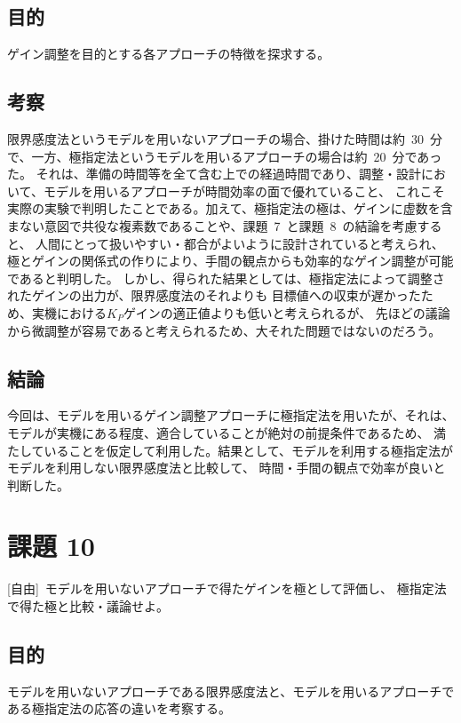\documentclass[10pt]{jarticle}
\begin{document}
\subsection{目的}
%
ゲイン調整を目的とする各アプローチの特徴を探求する。
%

\subsection{考察}
%
限界感度法というモデルを用いないアプローチの場合、掛けた時間は約\ 30\ 分で、一方、極指定法というモデルを用いるアプローチの場合は約\ 20\ 分であった。
それは、準備の時間等を全て含む上での経過時間であり、調整・設計において、モデルを用いるアプローチが時間効率の面で優れていること、
これこそ実際の実験で判明したことである。加えて、極指定法の極は、ゲインに虚数を含まない意図で共役な複素数であることや、課題\ 7\ と課題\ 8\ の結論を考慮すると、
人間にとって扱いやすい・都合がよいように設計されていると考えられ、極とゲインの関係式の作りにより、手間の観点からも効率的なゲイン調整が可能であると判明した。
しかし、得られた結果としては、極指定法によって調整されたゲインの出力が、限界感度法のそれよりも
目標値への収束が遅かったため、実機における$K_{P}$ゲインの適正値よりも低いと考えられるが、
先ほどの議論から微調整が容易であると考えられるため、大それた問題ではないのだろう。

%

\subsection{結論}
%
今回は、モデルを用いるゲイン調整アプローチに極指定法を用いたが、それは、モデルが実機にある程度、適合していることが絶対の前提条件であるため、
満たしていることを仮定して利用した。結果として、モデルを利用する極指定法がモデルを利用しない限界感度法と比較して、
時間・手間の観点で効率が良いと判断した。

%


\section{課題 10}
%
[自由]\ モデルを用いないアプローチで得たゲインを極として評価し、
極指定法で得た極と比較・議論せよ。
%

\subsection{目的}
%
モデルを用いないアプローチである限界感度法と、モデルを用いるアプローチである極指定法の応答の違いを考察する。
%
\end{document}
